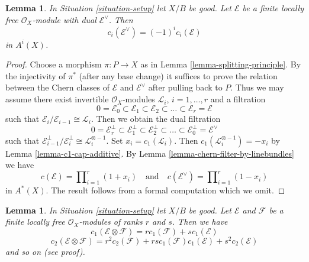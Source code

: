 \documentclass{stacks-project}
\theoremstyle{plain}
\newtheorem{lemma}[subsection]{Lemma}
\theoremstyle{definition}
\theoremstyle{remark}
\numberwithin{equation}{subsection}
\begin{document}
\begin{lemma}
\label{lemma-chern-classes-dual}
In Situation \ref{situation-setup} let $X/B$ be good.
Let $\mathcal{E}$ be a finite locally free $\mathcal{O}_X$-module
with dual $\mathcal{E}^\vee$. Then
$$
c_i(\mathcal{E}^\vee) = (-1)^i c_i(\mathcal{E})
$$
in $A^i(X)$.
\end{lemma}

\begin{proof}
Choose a morphism $\pi : P \to X$ as in
Lemma \ref{lemma-splitting-principle}.
By the injectivity of $\pi^*$ (after any base change)
it suffices to prove the relation between
the Chern classes of $\mathcal{E}$ and $\mathcal{E}^\vee$
after pulling back to $P$. Thus we may assume there
exist invertible $\mathcal{O}_X$-modules
${\mathcal L}_i$, $i = 1, \ldots, r$
and a filtration
$$
0 = \mathcal{E}_0 \subset \mathcal{E}_1 \subset \mathcal{E}_2
\subset \ldots \subset \mathcal{E}_r = \mathcal{E}
$$
such that $\mathcal{E}_i/\mathcal{E}_{i - 1} \cong \mathcal{L}_i$.
Then we obtain the dual filtration
$$
0 = \mathcal{E}_r^\perp \subset \mathcal{E}_1^\perp \subset \mathcal{E}_2^\perp
\subset \ldots \subset \mathcal{E}_0^\perp = \mathcal{E}^\vee
$$
such that $\mathcal{E}_{i - 1}^\perp/\mathcal{E}_i^\perp \cong
\mathcal{L}_i^{\otimes -1}$.
Set $x_i = c_1(\mathcal{L}_i)$.
Then $c_1(\mathcal{L}_i^{\otimes -1}) = - x_i$
by Lemma \ref{lemma-c1-cap-additive}.
By Lemma \ref{lemma-chern-filter-by-linebundles}
we have
$$
c(\mathcal{E}) = \prod\nolimits_{i = 1}^r (1 + x_i)
\quad\text{and}\quad
c(\mathcal{E}^\vee) = \prod\nolimits_{i = 1}^r (1 - x_i)
$$
in $A^*(X)$. The result follows from a formal computation
which we omit.
\end{proof}

\begin{lemma}
\label{lemma-chern-classes-tensor-product}
In Situation \ref{situation-setup} let $X/B$ be good.
Let $\mathcal{E}$ and $\mathcal{F}$ be a finite locally free
$\mathcal{O}_X$-modules of ranks $r$ and $s$. Then we have
$$
c_1(\mathcal{E} \otimes \mathcal{F})
=
r c_1(\mathcal{F}) + s c_1(\mathcal{E})
$$
$$
c_2(\mathcal{E} \otimes \mathcal{F})
=
r^2 c_2(\mathcal{F}) +
rs c_1(\mathcal{F})c_1(\mathcal{E}) +
s^2 c_2(\mathcal{E})
$$
and so on (see proof).
\end{lemma}
\end{document}
